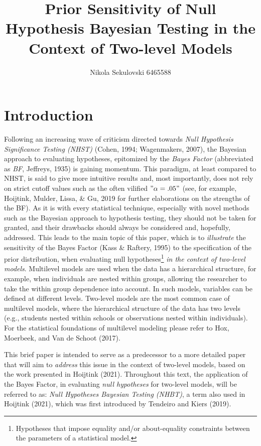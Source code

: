 \documentclass[
  english,
  man]{apa6}
\title{\textbf{Prior Sensitivity of Null Hypothesis Bayesian Testing in the Context of Two-level Models}}
\author{Nikola Sekulovski 6465588\textsuperscript{}}
\date{}
\affiliation{\vspace{0.5cm}\textsuperscript{} Utrecht University, Department of Methodology and Statistics}
\begin{document}
\maketitle

\hypertarget{introduction}{%
\section{Introduction}\label{introduction}}

Following an increasing wave of criticism directed towards \emph{Null Hypothesis Significance Testing (NHST)} (Cohen, 1994; Wagenmakers, 2007), the Bayesian approach to evaluating hypotheses, epitomized by the \emph{Bayes Factor} (abbreviated as \emph{BF}, Jeffreys, 1935) is gaining momentum. This paradigm, at least compared to NHST, is said to give more intuitive results and, most importantly, does not rely on strict cutoff values such as the often vilified \("\alpha = .05"\) (see, for example, Hoijtink, Mulder, Lissa, \& Gu, 2019 for further elaborations on the strengths of the BF). As it is with every statistical technique, especially with novel methods such as the Bayesian approach to hypothesis testing, they should not be taken for granted, and their drawbacks should always be considered and, hopefully, addressed. This leads to the main topic of this paper, which is to \emph{illustrate} the sensitivity of the Bayes Factor (Kass \& Raftery, 1995) to the specification of the prior distribution, when evaluating null hypotheses\footnote{Hypotheses that impose equality and/or about-equality constraints between the parameters of a statistical model.} \emph{in the context of two-level models}. Multilevel models are used when the data has a hierarchical structure, for example, when individuals are nested within groups, allowing the researcher to take the within group dependence into account. In such models, variables can be defined at different levels. Two-level models are the most common case of multilevel models, where the hierarchical structure of the data has two levels (e.g., students nested within schools or observations nested within individuals). For the statistical foundations of multilevel modeling please refer to Hox, Moerbeek, and Van de Schoot (2017).

This brief paper is intended to serve as a predecessor to a more detailed paper that will aim to \emph{address} this issue in the context of two-level models, based on the work presented in Hoijtink (2021). Throughout this text, the application of the Bayes Factor, in evaluating \emph{null hypotheses} for two-level models, will be referred to as: \emph{Null Hypotheses Bayesian Testing (NHBT)}, a term also used in Hoijtink (2021), which was first introduced by Tendeiro and Kiers (2019).
\end{document}
